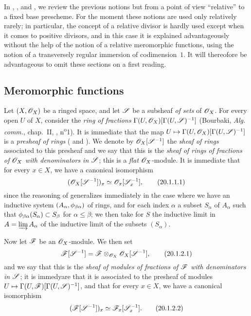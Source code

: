 In , , and , we review the previous notions but from a point of view ``relative'' to a fixed base prescheme.
For the moment these notions are used only relatively rarely; in particular, the concept of a relative divisor is hardly used except when it comes to positive divisors, and in this case it is explained advantageously without the help of the notion of a relative meromorphic functions, using the notion of a transversely regular immersion of codimension~$1$.
It will thereofore be advantageous to omit these sections on a first reading.

\subsection{Meromorphic functions}
\label{IV.20.1}

\begin{env}[20.1.1]
\label{IV.20.1.1}
Let $(X,\mathscr{O}_X)$ be a ringed space, and let $\mathscr{S}$ be a subsheaf \emph{of sets} of $\mathscr{O}_X$.
For every open $U$ of $X$, consider the \emph{ring of fractions} $\Gamma(U,\mathscr{O}_X)[\Gamma(U,\mathscr{S})^{-1}]$ (Bourbaki, \emph{Alg. comm.}, chap.~II, , n\textsuperscript{o}1).
It is immediate that the map $U\mapsto\Gamma(U,\sh{O}_X)[\Gamma(U,\sh{S})^{-1}]$ is a \emph{presheaf of rings} ( and ).
We denote by $\mathscr{O}_X[\mathscr{S}^{-1}]$ the \emph{sheaf of rings} associated to this presheaf and we say that this is the \emph{sheaf of rings of fractions of $\mathscr{O}_X$ with denominators in $\mathscr{S}$};
this is a \emph{flat} $\mathscr{O}_X$-module.
It is immediate that for every $x\in X$, we have a canonical isomorphism
\[
\label{IV.20.1.1.1}
  (\mathscr{O}_X[\mathscr{S}^{-1}])_x\simeq\mathscr{O}_x[\mathscr{S}_x^{-1}],
  \tag{20.1.1.1}
\]
since the reasoning of  generalizes immediately in the case where we have an inductive system $(A_\alpha,\phi_{\beta\alpha})$ of rings, and for each index $\alpha$ a subset $S_\alpha$ of $A_\alpha$ such that
$\phi_{\beta\alpha}(S_\alpha)\subset S_\beta$ for $\alpha\leq\beta$;
we then take for $S$ the inductive limit in $A=\varinjlim A_\alpha$ of the inductive limit of the subsets $(S_\alpha)$.
\end{env}

\begin{env}[20.1.2]
Now let $\mathscr{F}$ be an $\mathscr{O}_X$-module.
We then set
\[
\label{IV.20.1.2.1}
  \mathscr{F}[\mathscr{S}^{-1}]=\mathscr{F}\otimes_{\mathscr{O}_X}\mathscr{O}_X[\mathscr{S}^{-1}],
  \tag{20.1.2.1}
\]
and we say that this is the \emph{sheaf of modules of fractions of $\mathscr{F}$ with denominators in $\mathscr{S}$};
it is immedyare that it is associated to the presheaf of modules $U\mapsto\Gamma(U,\sh{F})[\Gamma(U,\sh{S})^{-1}]$, and that for every $x\in X$, we have a canonical isomorphism
\[
\label{IV.20.1.2.2}
  (\mathscr{F}[\mathscr{S}^{-1}])_x\simeq\mathscr{F}_x[\mathscr{S}_x^{-1}].
  \tag{20.1.2.2}
\]
\end{env}

